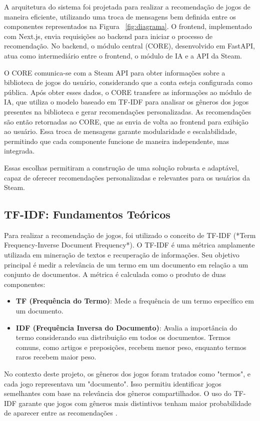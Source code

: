 \documentclass[conference]{IEEEtran}
\begin{document}
A arquitetura do sistema foi projetada para realizar a recomendação de jogos de maneira eficiente, utilizando uma troca de mensagens bem definida entre os componentes representados na Figura ~\ref{fig:diagrama}. O frontend, implementado com Next.js, envia requisições ao backend para iniciar o processo de recomendação. No backend, o módulo central (CORE), desenvolvido em FastAPI, atua como intermediário entre o frontend, o módulo de IA e a API da Steam.

O CORE comunica-se com a Steam API para obter informações sobre a biblioteca de jogos do usuário, considerando que a conta esteja configurada como pública. Após obter esses dados, o CORE transfere as informações ao módulo de IA, que utiliza o modelo baseado em TF-IDF para analisar os gêneros dos jogos presentes na biblioteca e gerar recomendações personalizadas. As recomendações são então retornadas ao CORE, que as envia de volta ao frontend para exibição ao usuário. Essa troca de mensagens garante modularidade e escalabilidade, permitindo que cada componente funcione de maneira independente, mas integrada.

Essas escolhas permitiram a construção de uma solução robusta e adaptável, capaz de oferecer recomendações personalizadas e relevantes para os usuários da Steam.

\subsection{TF-IDF: Fundamentos Teóricos}

Para realizar a recomendação de jogos, foi utilizado o conceito de TF-IDF (*Term Frequency-Inverse Document Frequency*). O TF-IDF é uma métrica amplamente utilizada em mineração de textos e recuperação de informações. Seu objetivo principal é medir a relevância de um termo em um documento em relação a um conjunto de documentos. A métrica é calculada como o produto de duas componentes:
\begin{itemize}
    \item \textbf{TF (Frequência do Termo)}: Mede a frequência de um termo específico em um documento.
    \item \textbf{IDF (Frequência Inversa do Documento)}: Avalia a importância do termo considerando sua distribuição em todos os documentos. Termos comuns, como artigos e preposições, recebem menor peso, enquanto termos raros recebem maior peso.
\end{itemize}

No contexto deste projeto, os gêneros dos jogos foram tratados como "termos", e cada jogo representava um "documento". Isso permitiu identificar jogos semelhantes com base na relevância dos gêneros compartilhados. O uso do TF-IDF garante que jogos com gêneros mais distintivos tenham maior probabilidade de aparecer entre as recomendações \cite{c6, c7}.
\end{document}

